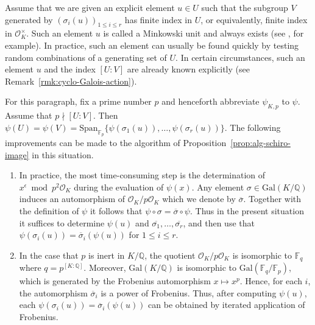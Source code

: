 \documentclass[12pt, a4paper, usenames]{amsart}
\newcommand{\Q}{\mathbb{Q}}
\newcommand{\F}{\mathbb{F}}
\theoremstyle{plain}
\theoremstyle{remark}
\theoremstyle{definition}
\newcommand{\Gal}{\mathrm{Gal}}
\newcommand{\Span}{\mathrm{Span}}
\begin{document}
Assume that we are given an explicit element $u \in U$ such that 
the subgroup $V$ generated by $(\sigma_{i}(u))_{1 \leq i \leq r}$ has finite index in $U$,
or equivalently, finite index in $\mathcal{O}_{K}^{\times}$.
Such an element $u$ is called a Minkowski unit and always exists
(see \cite[Lemma~5.27]{MR1421575}, for example). 
In practice, such an element can usually be found quickly by testing random combinations of a generating set of $U$.
In certain circumstances, such an element $u$ and the index $[U:V]$ are already known explicitly
(see Remark~\ref{rmk:cyclo-Galois-action}).

For this paragraph, fix a prime number $p$ and henceforth abbreviate $\psi_{K,p}$ to $\psi$.
Assume that $p \nmid [U:V]$. 
Then $\psi(U)=\psi(V) = \Span_{\F_{p}}\{\psi(\sigma_{1}(u)), \ldots, \psi(\sigma_{r}(u)) \}$. 
The following improvements can be made to the algorithm of 
Proposition~\ref{prop:alg-schiro-image} in this situation.
\begin{enumerate}
    \item 
    In practice, the most time-consuming step is the determination of $x^{\epsilon} \bmod p^{2} \mathcal{O}_{K}$ during the evaluation of $\psi(x)$.
    Any element $\sigma \in \Gal(K/\Q)$ induces an automorphism of 
    $\mathcal{O}_{K}/p\mathcal{O}_{K}$ which we denote by $\overline{\sigma}$.
    Together with the definition of $\psi$ it follows that $\psi \circ \sigma = \overline{\sigma} \circ \psi$.
    Thus in the present situation it suffices to determine $\psi(u)$
    and $\overline{\sigma_{1}}, \ldots, \overline{\sigma_{r}}$,
    and then use that $\psi(\sigma_{i}(u)) 
    = \overline{\sigma}_{i}(\psi(u))$ for $1 \leq i \leq r$.
    \item
    In the case that $p$ is inert in $K/\Q$, the quotient $\mathcal{O}_{K}/p\mathcal{O}_{K}$ is isomorphic to $\F_{q}$ where $q=p^{[K:\Q]}$. 
    Moreover, $\Gal(K/\Q)$ is isomorphic to $\Gal(\F_{q}/\F_{p})$,
    which is generated by the Frobenius automorphism $x \mapsto x^{p}$.
    Hence, for each $i$, the automorphism $\overline{\sigma}_{i}$ is a power of Frobenius.
    Thus, after computing $\psi(u)$, each 
    $\psi(\sigma_{i}(u)) = \overline{\sigma}_{i}(\psi(u))$ can be obtained
    by iterated application of Frobenius.
\end{enumerate}
\end{document}
